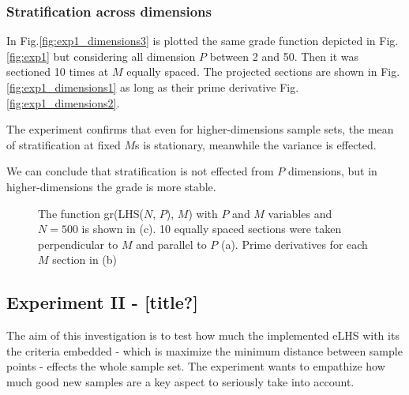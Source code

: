 \documentclass[12pt]{extarticle}
\newcommand{\mfigref}[1]{Fig.\ref{#1}}
\begin{document}
\subsubsection{Stratification across dimensions}
In \mfigref{fig:exp1_dimensions3} is plotted the same grade function depicted in \mfigref{fig:exp1} but considering all dimension $P$ between 2 and 50. Then it was sectioned 10 times at $M$ equally spaced. The projected sections are shown in \mfigref{fig:exp1_dimensions1} as long as their prime derivative \mfigref{fig:exp1_dimensions2}. 

The experiment confirms that even for higher-dimensions sample sets, the mean of stratification at fixed $M$s is stationary, meanwhile the variance is effected.

We can conclude that stratification is not effected from $P$ dimensions, but in higher-dimensions the grade is more stable.

\begin{figure}[H]
    \centering
    \begin{subfigure}[b]{0.49\textwidth}
        \centering
    \end{subfigure}
    \begin{subfigure}[b]{0.49\textwidth}
        \centering
    \end{subfigure}
    \begin{subfigure}[b]{0.3\textwidth}
        \centering
    \end{subfigure}
    \captionsetup{skip=0pt}
    \caption{The function gr(LHS($N$, $P$), $M$) with $P$ and $M$ variables and $N = 500$ is shown in (c). 10 equally spaced sections were taken perpendicular to $M$ and parallel to $P$ (a).  Prime derivatives for each $M$ section in (b)}
    \label{fig:exp1_dimensions}
\end{figure}

\subsection{Experiment II - [title?]}
\label{subsec:exp2}
The aim of this investigation is to test how much the implemented eLHS with its the criteria embedded - which is maximize the minimum distance between sample points - effects the whole sample set. The experiment wants to empathize how much good new samples are a key aspect to seriously take into account.
\end{document}
